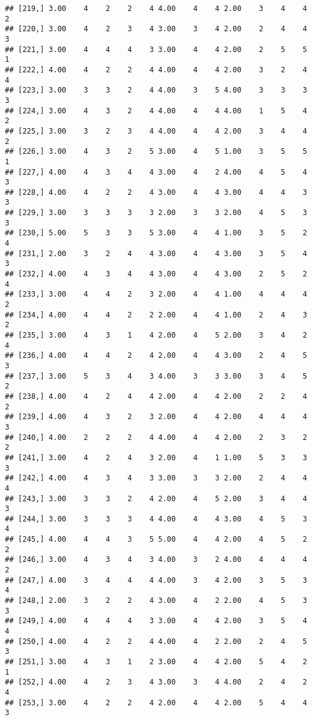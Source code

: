 \documentclass[]{article}
\begin{document}
\begin{verbatim}
## [219,] 3.00    4    2    2    4 4.00    4    4 2.00    3    4    4    2
## [220,] 3.00    4    2    3    4 3.00    3    4 2.00    2    4    4    3
## [221,] 3.00    4    4    4    3 3.00    4    4 2.00    2    5    5    1
## [222,] 4.00    4    2    2    4 4.00    4    4 2.00    3    2    4    4
## [223,] 3.00    3    3    2    4 4.00    3    5 4.00    3    3    3    3
## [224,] 3.00    4    3    2    4 4.00    4    4 4.00    1    5    4    2
## [225,] 3.00    3    2    3    4 4.00    4    4 2.00    3    4    4    2
## [226,] 3.00    4    3    2    5 3.00    4    5 1.00    3    5    5    1
## [227,] 4.00    4    3    4    4 3.00    4    2 4.00    4    5    4    3
## [228,] 4.00    4    2    2    4 3.00    4    4 3.00    4    4    3    3
## [229,] 3.00    3    3    3    3 2.00    3    3 2.00    4    5    3    3
## [230,] 5.00    5    3    3    5 3.00    4    4 1.00    3    5    2    4
## [231,] 2.00    3    2    4    4 3.00    4    4 3.00    3    5    4    3
## [232,] 4.00    4    3    4    4 3.00    4    4 3.00    2    5    2    4
## [233,] 3.00    4    4    2    3 2.00    4    4 1.00    4    4    4    2
## [234,] 4.00    4    4    2    2 2.00    4    4 1.00    2    4    3    2
## [235,] 3.00    4    3    1    4 2.00    4    5 2.00    3    4    2    4
## [236,] 4.00    4    4    2    4 2.00    4    4 3.00    2    4    5    3
## [237,] 3.00    5    3    4    3 4.00    3    3 3.00    3    4    5    2
## [238,] 4.00    4    2    4    4 2.00    4    4 2.00    2    2    4    2
## [239,] 4.00    4    3    2    3 2.00    4    4 2.00    4    4    4    3
## [240,] 4.00    2    2    2    4 4.00    4    4 2.00    2    3    2    2
## [241,] 3.00    4    2    4    3 2.00    4    1 1.00    5    3    3    3
## [242,] 4.00    4    3    4    3 3.00    3    3 2.00    2    4    4    4
## [243,] 3.00    3    3    2    4 2.00    4    5 2.00    3    4    4    3
## [244,] 3.00    3    3    3    4 4.00    4    4 3.00    4    5    3    4
## [245,] 4.00    4    4    3    5 5.00    4    4 2.00    4    5    2    2
## [246,] 3.00    4    3    4    3 4.00    3    2 4.00    4    4    4    2
## [247,] 4.00    3    4    4    4 4.00    3    4 2.00    3    5    3    4
## [248,] 2.00    3    2    2    4 3.00    4    2 2.00    4    5    3    3
## [249,] 4.00    4    4    4    3 3.00    4    4 2.00    3    5    4    4
## [250,] 4.00    4    2    2    4 4.00    4    2 2.00    2    4    5    3
## [251,] 3.00    4    3    1    2 3.00    4    4 2.00    5    4    2    1
## [252,] 4.00    4    2    3    4 3.00    3    4 4.00    2    4    2    4
## [253,] 3.00    4    2    2    4 2.00    4    4 2.00    5    4    4    3

\end{verbatim}
\end{document}
